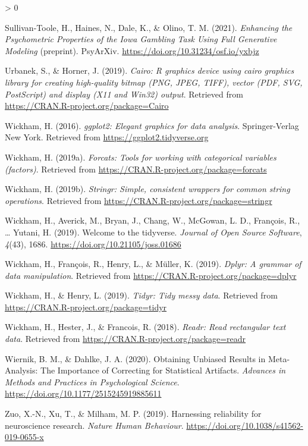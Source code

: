 \documentclass[
  english,
  man,floatsintext]{apa6}
\newlength{\cslhangindent}
\newenvironment{CSLReferences}[2] %
 {%
  \setlength{\parindent}{0pt}
  \ifodd #1 \everypar{\setlength{\hangindent}{\cslhangindent}}\ignorespaces\fi
  \ifnum #2 > 0
  \setlength{\parskip}{#2\baselineskip}
  \fi
 }%
 {}
\begin{document}
\begin{CSLReferences}{1}{0}
\leavevmode\hypertarget{ref-sullivan-toole_enhancing_2021}{}%
Sullivan-Toole, H., Haines, N., Dale, K., \& Olino, T. M. (2021). \emph{Enhancing the {Psychometric} {Properties} of the {Iowa} {Gambling} {Task} {Using} {Full} {Generative} {Modeling}} (preprint). PsyArXiv. \url{https://doi.org/10.31234/osf.io/yxbjz}

\leavevmode\hypertarget{ref-R-Cairo}{}%
Urbanek, S., \& Horner, J. (2019). \emph{Cairo: R graphics device using cairo graphics library for creating high-quality bitmap (PNG, JPEG, TIFF), vector (PDF, SVG, PostScript) and display (X11 and Win32) output}. Retrieved from \url{https://CRAN.R-project.org/package=Cairo}

\leavevmode\hypertarget{ref-R-ggplot2}{}%
Wickham, H. (2016). \emph{ggplot2: Elegant graphics for data analysis}. Springer-Verlag New York. Retrieved from \url{https://ggplot2.tidyverse.org}

\leavevmode\hypertarget{ref-R-forcats}{}%
Wickham, H. (2019a). \emph{Forcats: Tools for working with categorical variables (factors)}. Retrieved from \url{https://CRAN.R-project.org/package=forcats}

\leavevmode\hypertarget{ref-R-stringr}{}%
Wickham, H. (2019b). \emph{Stringr: Simple, consistent wrappers for common string operations}. Retrieved from \url{https://CRAN.R-project.org/package=stringr}

\leavevmode\hypertarget{ref-R-tidyverse}{}%
Wickham, H., Averick, M., Bryan, J., Chang, W., McGowan, L. D., François, R., \ldots{} Yutani, H. (2019). Welcome to the {tidyverse}. \emph{Journal of Open Source Software}, \emph{4}(43), 1686. \url{https://doi.org/10.21105/joss.01686}

\leavevmode\hypertarget{ref-R-dplyr}{}%
Wickham, H., François, R., Henry, L., \& Müller, K. (2019). \emph{Dplyr: A grammar of data manipulation}. Retrieved from \url{https://CRAN.R-project.org/package=dplyr}

\leavevmode\hypertarget{ref-R-tidyr}{}%
Wickham, H., \& Henry, L. (2019). \emph{Tidyr: Tidy messy data}. Retrieved from \url{https://CRAN.R-project.org/package=tidyr}

\leavevmode\hypertarget{ref-R-readr}{}%
Wickham, H., Hester, J., \& Francois, R. (2018). \emph{Readr: Read rectangular text data}. Retrieved from \url{https://CRAN.R-project.org/package=readr}

\leavevmode\hypertarget{ref-wiernik_obtaining_2020}{}%
Wiernik, B. M., \& Dahlke, J. A. (2020). Obtaining {Unbiased} {Results} in {Meta}-{Analysis}: {The} {Importance} of {Correcting} for {Statistical} {Artifacts}. \emph{Advances in Methods and Practices in Psychological Science}. \url{https://doi.org/10.1177/2515245919885611}

\leavevmode\hypertarget{ref-zuo_harnessing_2019}{}%
Zuo, X.-N., Xu, T., \& Milham, M. P. (2019). Harnessing reliability for neuroscience research. \emph{Nature Human Behaviour}. \url{https://doi.org/10.1038/s41562-019-0655-x}

\end{CSLReferences}

\endgroup
\end{document}
